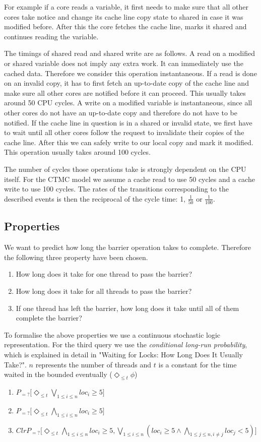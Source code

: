 \documentclass[a4paper, 10pt]{article}
\begin{document}
For example if a core reads a variable, it first needs to make sure that all other cores take notice and change its cache line copy state to shared in case it was modified before. After this the core fetches the cache line, marks it shared and continues reading the variable.

The timings of shared read and shared write are as follows. A read on a modified or shared variable does not imply any extra work. It can immediately use the cached data. Therefore we consider this operation instantaneous. If a read is done on an invalid copy, it has to first fetch an up-to-date copy of the cache line and make sure all other cores are notified before it can proceed. This usually takes around 50 CPU cycles. A write on a modified variable is instantaneous, since all other cores do not have an up-to-date copy and therefore do not have to be notified. If the cache line in question is in a shared or invalid state, we first have to wait until all other cores follow the request to invalidate their copies of the  cache line. After this we can safely write to our local copy and mark it modified. This operation usually takes around 100 cycles. 

The number of cycles those operations take is strongly dependent on the CPU itself. For the CTMC model we assume a cache read to use 50 cycles and a cache write to use 100 cycles. The rates of the transitions corresponding to the described events is then the reciprocal of the cycle time: 1, $\frac{1}{50}$ or $\frac{1}{100}$.
\subsection{Properties}
We want to predict how long the barrier operation takes to complete. Therefore the following three property have been chosen.
\begin{enumerate}
	\item How long does it take for one thread to pass the barrier?
	\item How long does it take for all threads to pass the barrier?
	\item If one thread has left the barrier, how long does it take until all of them complete the barrier?
\end{enumerate}

To formalise the above properties we use a continuous stochastic logic\cite{assb96}\cite{bkh99} representation. For the third query we use the \emph{conditional long-run probability}, which is explained in detail in "Waiting for Locks: How Long Does It Usually Take?"\cite{fmix}. $n$ represents the number of threads and $t$ is a constant for the time waited in the bounded eventually ($\Diamond_{\le t} \phi$)
\begin{enumerate}
	\item $P_{=?} \big[\Diamond_{\le t} \bigvee_{1 \le i \le n} loc_i \ge 5\big]$
	\item $P_{=?} \big[\Diamond_{\le t} \bigwedge_{1 \le i \le n} loc_i \ge 5\big]$
	\item $ClrP_{=?} \big[\Diamond_{\le t} \bigwedge_{1 \le i \le n} loc_i \ge 5, \bigvee_{1 \le i \le n} (loc_i \ge 5 \wedge \bigwedge_{1 \le j \le n, i \neq j} loc_j < 5)\big]$
\end{enumerate}
\end{document}
